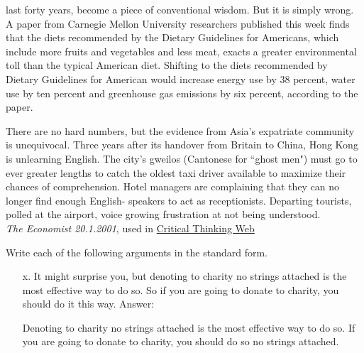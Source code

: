 \begin{practiceproblems}
\begin{earg}
	last forty years, become a piece of conventional wisdom. But it is simply
	wrong. A paper from Carnegie Mellon University researchers published
	this week finds that the diets recommended by the Dietary Guidelines for
	Americans, which include more fruits and vegetables and less meat, exacts
	a greater environmental toll than the typical American diet. Shifting to
	the diets recommended by Dietary Guidelines for American would increase
	energy use by 38 percent, water use by ten percent and greenhouse gas
	emissions by six percent, according to the paper.
	\item There are no hard numbers, but the evidence from Asia's expatriate community is unequivocal. Three years after its handover from Britain to China, Hong Kong is unlearning English. The city's gweilos (Cantonese for ``ghost men") must go to ever greater lengths to catch the oldest taxi driver available to maximize their chances of comprehension. Hotel managers are complaining that they can no longer find enough English- speakers to act as receptionists. Departing tourists, polled at the airport, voice growing frustration at not being understood. \\ \emph{The Economist 20.1.2001}, used in \href{https://philosophy.hku.hk/think/arg/arg.php}{Critical Thinking Web}
\end{earg}

\problempart
Write each of the following arguments in the standard form.
\begin{enumerate}
	\item[x.] It might surprise you, but denoting to charity no strings attached is the most effective way to do so. So if you are going to donate to charity, you should do it this way.
	\prem Answer:
	\begin{earg}
	\prem	Denoting to charity no strings attached is the most effective way to do so.
	\conc	If you are going to donate to charity, you should do so no strings attached.
	\end{earg}


\end{enumerate}
\end{practiceproblems}
